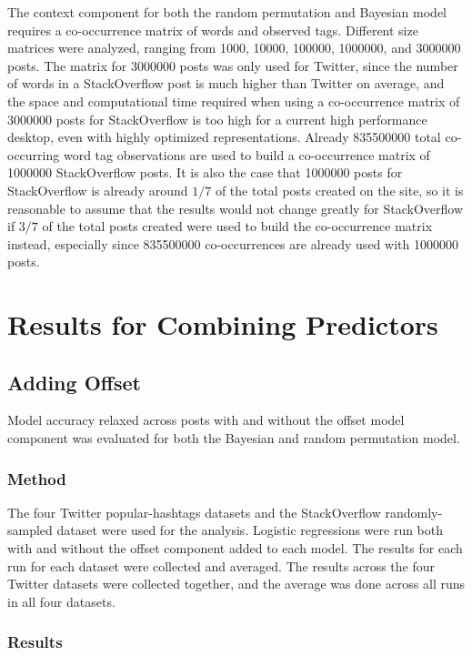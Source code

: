 \documentclass[man,floatsintext,donotrepeattitle]{apa6}
\begin{document}
The context component for both the random permutation and Bayesian model requires a co-occurrence matrix of words and observed tags.
Different size matrices were analyzed, ranging from \num{1000}, \num{10000}, \num{100000}, \num{1000000}, and \num{3000000} posts.
The matrix for \num{3000000} posts was only used for Twitter, since the number of words in a StackOverflow post is much higher than Twitter on average,
and the space and computational time required when using a co-occurrence matrix of \num{3000000} posts for StackOverflow is too high for a current high performance desktop, even with highly optimized representations.
Already \num{835500000} total co-occurring word tag observations are used to build a co-occurrence matrix of \num{1000000} StackOverflow posts.
It is also the case that \num{1000000} posts for StackOverflow is already around $1/7$ of the total posts created on the site,
so it is reasonable to assume that the results would not change greatly for StackOverflow if $3/7$ of the total posts created were used to build the co-occurrence matrix instead,
especially since \num{835500000} co-occurrences are already used with \num{1000000} posts.

\section{Results for Combining Predictors}

\subsection{Adding Offset}

Model accuracy relaxed across posts with and without the offset model component was evaluated for both the Bayesian and random permutation model.

\subsubsection{Method}

The four Twitter popular-hashtags datasets and the StackOverflow randomly-sampled dataset were used for the analysis.
Logistic regressions were run both with and without the offset component added to each model.
The results for each run for each dataset were collected and averaged.
The results across the four Twitter datasets were collected together, and the average was done across all runs in all four datasets.

\subsubsection{Results}
\end{document}
